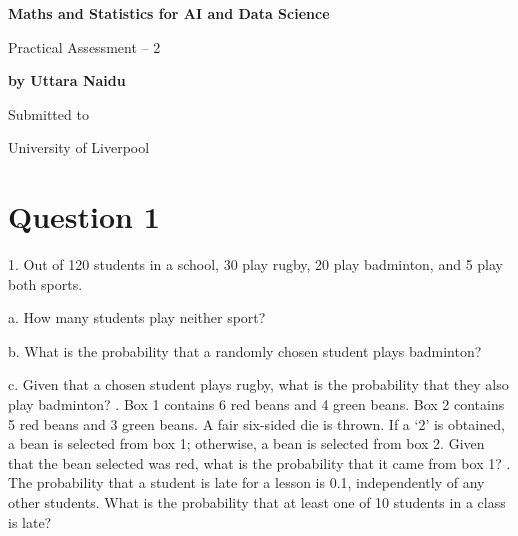 \documentclass[a4paper]{report}
\begin{document}
\pagestyle{fancy} %

\fancyhf{} %
\fancyhead[C]{} %
\fancyhead[R]{} %
\fancyfoot[C]{\thepage} %

\begin{titlepage}
    \begin{center}
        \vspace*{1cm}
            
        \Huge
        \textbf{Maths and Statistics for AI and Data Science}
            
        \vspace{0.5cm}
        \LARGE
        Practical Assessment – 2
            
        \vspace{1.5cm}
            
        \textbf{by Uttara Naidu}
            
        \vfill
            
        Submitted to            

        University of Liverpool\\
            
    \end{center}
\end{titlepage}     



\section*{Question 1}

1. Out of 120 students in a school, 30 play rugby, 20 play badminton, and 5 play both sports.

a. How many students play neither sport? 

b. What is the probability that a randomly chosen student plays badminton? 

c. Given that a chosen student plays rugby, what is the probability that they also play badminton? 
. Box 1 contains 6 red beans and 4 green beans. Box 2 contains 5 red beans and 3 green beans. A fair six-sided die is thrown. If a ‘2’ is obtained, a bean is selected from box 1; otherwise, a bean is selected from box 2. Given that the bean selected was red, what is the probability that it came from box 1? 
. The probability that a student is late for a lesson is 0.1, independently of any other students. What is the probability that at least one of 10 students in a class is late? 
\end{document}
